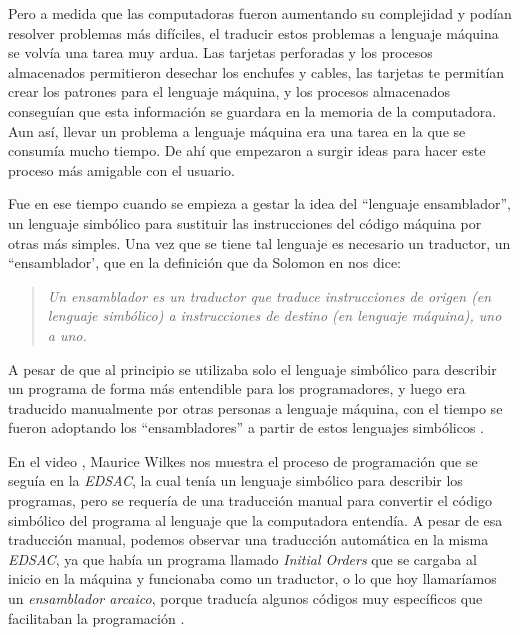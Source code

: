 \documentclass[letterpaper,12pt,oneside]{book}
\begin{document}
		Pero a medida que las computadoras fueron aumentando su complejidad y podían resolver problemas más difíciles, el traducir estos problemas 
		a lenguaje máquina se volvía una tarea muy ardua. Las tarjetas perforadas y los procesos almacenados permitieron desechar los enchufes y cables,
		las tarjetas te permitían crear los patrones para el lenguaje máquina, y los procesos almacenados conseguían que esta información se guardara
		en la memoria de la computadora. Aun así, llevar un problema a lenguaje máquina era una tarea en la que se consumía mucho tiempo. De ahí que empezaron a surgir ideas para hacer este proceso
		más amigable con el usuario.
		
		
		
		
		Fue en ese tiempo cuando se empieza a gestar la idea del ``lenguaje ensamblador'',
		un lenguaje simbólico para sustituir las instrucciones del código máquina por otras más simples. 
		Una vez que se tiene tal lenguaje es necesario un traductor, un ``ensamblador', que en la definición que da 
		Solomon en \cite{salomon_assemblers_1992} nos
		dice:
		
		\begin{quote}
			\emph{Un ensamblador es un traductor que traduce instrucciones de origen (en lenguaje simbólico) a instrucciones de destino (en lenguaje máquina), 
			uno a uno.}
		\end{quote}
		
				
		A pesar de que al principio se utilizaba solo el lenguaje simbólico
		para describir un programa de forma más entendible para los programadores, y luego era traducido manualmente por otras personas a lenguaje máquina, 
		con el tiempo se fueron adoptando los ``ensambladores'' a partir de estos lenguajes simbólicos \cite{salomon_assemblers_1992}.
		
  
        En el video \cite{maurice_vincent_wilkes_edsac_1976}, Maurice Wilkes nos muestra el proceso de programación que se
		seguía en la \textit{EDSAC}, la cual tenía un lenguaje simbólico para describir los programas, pero se requería de una traducción manual
		para convertir el código simbólico del programa al lenguaje que la computadora entendía. A pesar de esa traducción manual, podemos observar una traducción automática
		en la misma \textit{EDSAC}, ya que había un programa llamado \textit{Initial Orders} que se cargaba al inicio en la máquina y funcionaba como
		un traductor, o lo que hoy llamaríamos un \textit{ensamblador arcaico}, porque traducía algunos códigos muy específicos que facilitaban la programación \cite{salomon_assemblers_1992,richards_edsac_nodate}.
		
\end{document}
